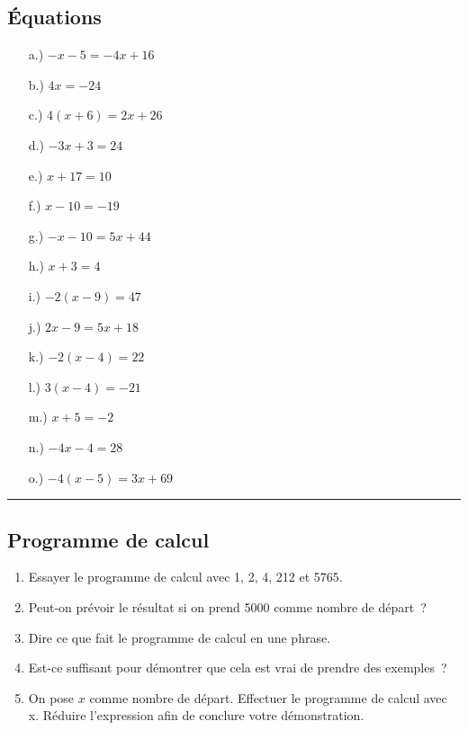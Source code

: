 \documentclass[11pt]{article}
\newcommand{\horrule}[1]{\rule{\linewidth}{#1}} %
\begin{document}
\subsection*{Équations}
\begin{multicols}{3}\noindent
  \begin{enumerate}
  \item[a.)] $-x - 5 = -4x + 16$
  \item[b.)] $4x = -24$
  \item[c.)] $4(x + 6) = 2x + 26$
  \item[d.)] $-3x + 3 = 24$
  \item[e.)] $x + 17 = 10$
  \item[f.)] $x - 10 = -19$
  \item[g.)] $-x - 10 = 5x + 44$
  \item[h.)] $x + 3 = 4$
  \item[i.)] $-2(x - 9) = 47$
  \item[j.)] $2x - 9 = 5x + 18$
  \item[k.)] $-2(x - 4) = 22$
  \item[l.)] $	3(x - 4) = -21$
  \item[m.)] $x + 5 = -2$
  \item[n.)] $-4x - 4 = 28$
  \item[o.)] $-4(x - 5) = 3x + 69$
  \end{enumerate}
\end{multicols}

\vspace{-0.4cm}
\horrule{1px}
\vspace{-0.8cm}

\subsection*{Programme de calcul}

\begin{enumerate}
  \item Essayer le programme de calcul avec 1, 2, 4, 212 et 5765.
  \item Peut-on prévoir le résultat si on prend 5000 comme nombre de départ ?
  \item Dire ce que fait le programme de calcul en une phrase.
  \item Est-ce suffisant pour démontrer que cela est vrai de prendre des exemples ?
  \item On pose $x$ comme nombre de départ. Effectuer le programme de calcul avec x. Réduire l’expression afin de conclure votre démonstration.
\end{enumerate}
\end{document}
